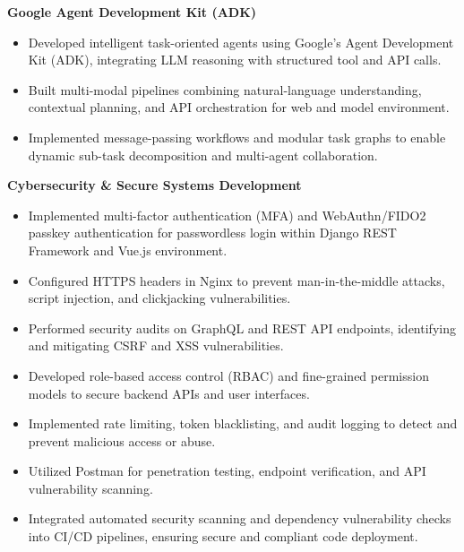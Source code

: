 \documentclass[11pt]{article}
\begin{document}
\textbf{Google Agent Development Kit (ADK)}
\begin{itemize}
    \item Developed intelligent task-oriented agents using Google's Agent Development Kit (ADK), integrating LLM reasoning with structured tool and API calls.
    \item Built multi-modal pipelines combining natural-language understanding, contextual planning, and API orchestration for web and model environment.
    \item Implemented message-passing workflows and modular task graphs to enable dynamic sub-task decomposition and multi-agent collaboration.
\end{itemize}

\textbf{Cybersecurity \& Secure Systems Development}
\begin{itemize}
    \item Implemented multi-factor authentication (MFA) and WebAuthn/FIDO2 passkey authentication for passwordless login within Django REST Framework and Vue.js environment.
    \item Configured HTTPS headers in Nginx to prevent man-in-the-middle attacks, script injection, and clickjacking vulnerabilities.
    \item Performed security audits on GraphQL and REST API endpoints, identifying and mitigating CSRF and XSS vulnerabilities.
    \item Developed role-based access control (RBAC) and fine-grained permission models to secure backend APIs and user interfaces.
    \item Implemented rate limiting, token blacklisting, and audit logging to detect and prevent malicious access or abuse.
    \item Utilized Postman for penetration testing, endpoint verification, and API vulnerability scanning.
    \item Integrated automated security scanning and dependency vulnerability checks into CI/CD pipelines, ensuring secure and compliant code deployment.
\end{itemize}
\end{document}
